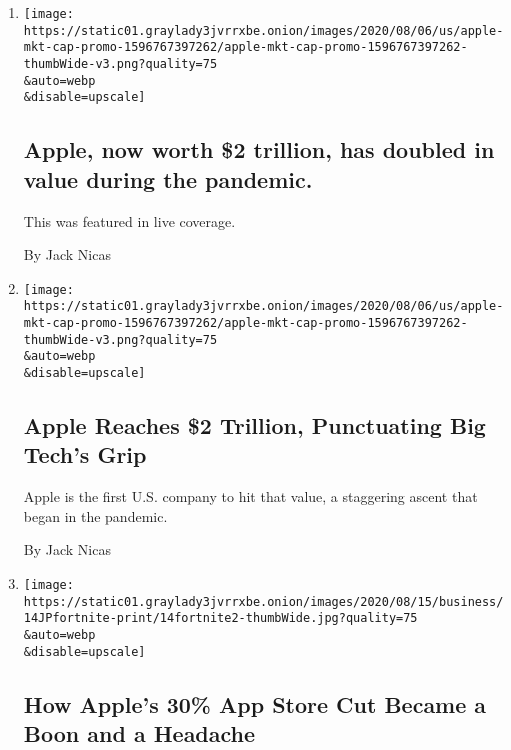 \begin{enumerate}
\def\labelenumi{\arabic{enumi}.}
\item
  \href{/live/2020/08/19/business/stock-market-today-coronavirus/apple-now-worth-2-trillion-has-doubled-in-value-during-the-pandemic}{}

  \texttt{[image: https://static01.graylady3jvrrxbe.onion/images/2020/08/06/us/apple-mkt-cap-promo-1596767397262/apple-mkt-cap-promo-1596767397262-thumbWide-v3.png?quality=75\\\&auto=webp\\\&disable=upscale]}

  \hypertarget{apple-now-worth-2-trillion-has-doubled-in-value-during-the-pandemic}{%
  \subsection{Apple, now worth \$2 trillion, has doubled in value during
  the
  pandemic.}\label{apple-now-worth-2-trillion-has-doubled-in-value-during-the-pandemic}}

  This was featured in live coverage.

  By Jack Nicas
\item
  \href{/2020/08/19/technology/apple-2-trillion.html}{}

  \texttt{[image: https://static01.graylady3jvrrxbe.onion/images/2020/08/06/us/apple-mkt-cap-promo-1596767397262/apple-mkt-cap-promo-1596767397262-thumbWide-v3.png?quality=75\\\&auto=webp\\\&disable=upscale]}

  \hypertarget{apple-reaches-2-trillion-punctuating-big-techs-grip}{%
  \subsection{Apple Reaches \$2 Trillion, Punctuating Big Tech's
  Grip}\label{apple-reaches-2-trillion-punctuating-big-techs-grip}}

  Apple is the first U.S. company to hit that value, a staggering ascent
  that began in the pandemic.

  By Jack Nicas
\item
  \href{/2020/08/14/technology/apple-app-store-epic-games-fortnite.html}{}

  \texttt{[image: https://static01.graylady3jvrrxbe.onion/images/2020/08/15/business/14JPfortnite-print/14fortnite2-thumbWide.jpg?quality=75\\\&auto=webp\\\&disable=upscale]}

  \hypertarget{how-apples-30-app-store-cut-became-a-boon-and-a-headache}{%
  \subsection{How Apple's 30\% App Store Cut Became a Boon and a
  Headache}\label{how-apples-30-app-store-cut-became-a-boon-and-a-headache}}


\end{enumerate}
